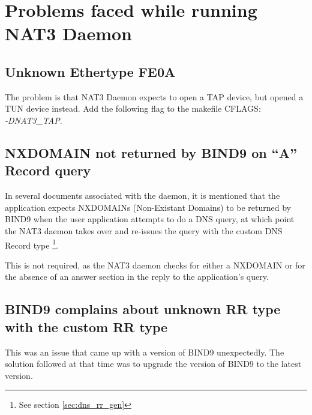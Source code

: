 \section{Problems faced while running NAT3 Daemon}

\subsection{Unknown Ethertype FE0A}
The problem is that NAT3 Daemon expects to open a TAP device, but opened a TUN device instead. Add the following flag to the makefile CFLAGS:\\
\textit{-DNAT3\_TAP}.

\subsection{NXDOMAIN not returned by BIND9 on ``A'' Record query}
In several documents associated with the daemon, it is mentioned that the application expects NXDOMAINs (Non-Existant Domains) to be returned by BIND9 when the user application attempts to do a DNS query, at which point the NAT3 daemon takes over and re-issues the query with the custom DNS Record type \footnote{See section \ref{sec:dns_rr_gen}}.

This is not required, as the NAT3 daemon checks for either a NXDOMAIN or for the absence of an answer section in the reply to the application's query. 

\subsection{BIND9 complains about unknown RR type with the custom RR type}
This was an issue that came up with a version of BIND9 unexpectedly. The solution followed at that time was to upgrade the version of BIND9 to the latest version.
